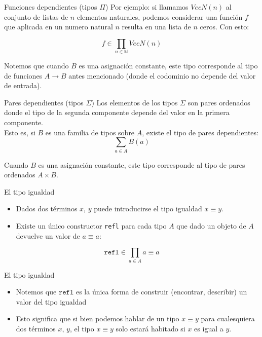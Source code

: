 \documentclass[11pt]{beamer}
\newcommand{\bit}{\begin{itemize}\setlength\itemsep{1em}}
\newcommand{\eit}{\end{itemize}}
\begin{document}
\begin{frame}{Funciones dependientes (tipos $\Pi$)}
Por ejemplo: si llamamos $VecN(n)$ al conjunto de listas de $n$ elementos naturales, podemos considerar una función $f$ que aplicada en un numero natural $n$ resulta en una lista de $n$ ceros. Con esto:
 
\[
  f \in \prod_{n \in \mathbb{N}} VecN(n)
\]

Notemos que cuando $B$ es una asignación constante, este tipo corresponde al tipo de funciones $A \rightarrow B$ antes mencionado (donde el codominio no depende del valor de entrada).
\end{frame}

\begin{frame}{Pares dependientes (tipos $\Sigma$)}
Los elementos de los tipos $\Sigma$ son pares ordenados donde el tipo de la segunda componente depende del valor en la primera componente.\\

Esto es, si $B$ es una familia de tipos sobre $A$, existe el tipo de pares dependientes: \[ \sum_{a \in A} B(a) \]

Cuando $B$ es una asignación constante, este tipo corresponde al tipo de pares ordenados $A \times B$.
\end{frame}


\begin{frame}{El tipo igualdad}
\bit
\item Dados dos términos $x$, $y$ puede introducirse el tipo igualdad $x \equiv y$. 

\item Existe un único constructor \texttt{refl} para cada tipo $A$ que dado un objeto de $A$ devuelve un valor de $a \equiv a$:
\eit
\[
  \texttt{refl} \in \prod_{a \in A} a \equiv a
\]

\end{frame}


\begin{frame}{El tipo igualdad}

\bit

\item Notemos que $\texttt{refl}$ es la única forma de construir (encontrar, describir) un valor del tipo igualdad
\item Esto significa que si bien podemos hablar de un tipo $x \equiv y$ para cualesquiera dos términos $x$, $y$, el tipo $x \equiv y$ solo estará habitado si $x$ es igual a $y$.
\eit
\end{frame}
\end{document}
